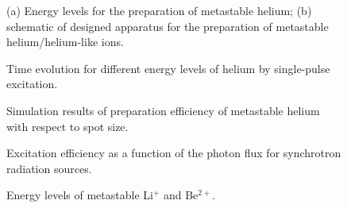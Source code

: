 \documentclass[12pt,a4paper]{article}
\begin{document}
\begin{figure}[htbp]
\centering
\caption{(a) Energy levels for the preparation of metastable helium; (b) schematic of designed apparatus for the preparation of metastable helium/helium-like ions.}
\label{fig:energy_levels}
\end{figure}

\begin{figure}[htbp]
\centering
\caption{Time evolution for different energy levels of helium by single-pulse excitation.}
\label{fig:time_evolution}
\end{figure}

\begin{figure}[htbp]
\centering
\caption{Simulation results of preparation efficiency of metastable helium with respect to spot size.}
\label{fig:spot_size}
\end{figure}

\begin{figure}[htbp]
\centering
\caption{Excitation efficiency as a function of the photon flux for synchrotron radiation sources.}
\label{fig:photon_flux}
\end{figure}

\begin{figure}[htbp]
\centering
\caption{Energy levels of metastable Li$^+$ and Be$^{2+}$.}
\label{fig:ion_levels}
\end{figure}
\end{document}
